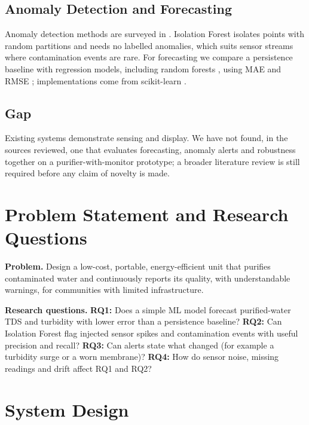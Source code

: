 \documentclass[10pt,letterpaper,twocolumn]{article}
\begin{document}
\subsection{Anomaly Detection and Forecasting}
Anomaly detection methods are surveyed in \cite{chandola2009}. Isolation Forest \cite{liu2008} isolates points with random partitions and needs no labelled anomalies, which suits sensor streams where contamination events are rare. For forecasting we compare a persistence baseline with regression models, including random forests \cite{breiman2001}, using MAE and RMSE \cite{hyndman2006}; implementations come from scikit-learn \cite{sklearn}.

\subsection{Gap}
Existing systems demonstrate sensing and display. We have not found, in the sources reviewed, one that evaluates forecasting, anomaly alerts and robustness together on a purifier-with-monitor prototype; a broader literature review is still required before any claim of novelty is made.

\section{Problem Statement and Research Questions}
\textbf{Problem.} Design a low-cost, portable, energy-efficient unit that purifies contaminated water and continuously reports its quality, with understandable warnings, for communities with limited infrastructure.

\textbf{Research questions.} \textbf{RQ1:} Does a simple ML model forecast purified-water TDS and turbidity with lower error than a persistence baseline? \textbf{RQ2:} Can Isolation Forest flag injected sensor spikes and contamination events with useful precision and recall? \textbf{RQ3:} Can alerts state what changed (for example a turbidity surge or a worn membrane)? \textbf{RQ4:} How do sensor noise, missing readings and drift affect RQ1 and RQ2?

\section{System Design}
\end{document}
